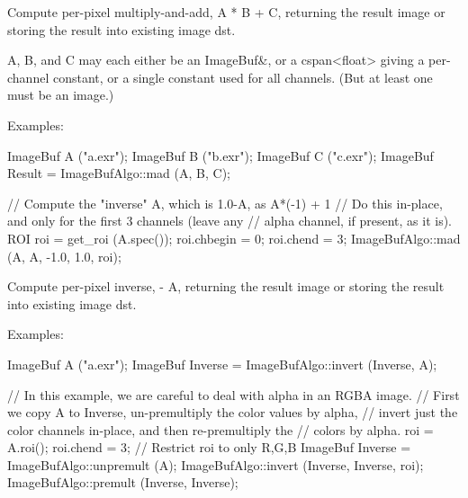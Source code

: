 Compute per-pixel multiply-and-add, {\cf A * B + C}, returning the result image
or storing the result into existing image {\cf dst}.

{\cf A}, {\cf B}, and {\cf C} may each either be an {\cf ImageBuf\&}, or a
{\cf cspan<float>} giving a per-channel constant, or a single constant used
for all channels. (But at least one must be an image.)

\smallskip
\noindent Examples:
\begin{code}
    ImageBuf A ("a.exr");
    ImageBuf B ("b.exr");
    ImageBuf C ("c.exr");
    ImageBuf Result = ImageBufAlgo::mad (A, B, C);

    // Compute the "inverse" A, which is 1.0-A, as A*(-1) + 1
    // Do this in-place, and only for the first 3 channels (leave any
    // alpha channel, if present, as it is).
    ROI roi = get_roi (A.spec());
    roi.chbegin = 0;  roi.chend = 3;
    ImageBufAlgo::mad (A, A, -1.0, 1.0, roi);
\end{code}
\apiend


 

Compute per-pixel inverse, { - A}, returning the result image
or storing the result into existing image {\cf dst}.

\smallskip
\noindent Examples:
\begin{code}
    ImageBuf A ("a.exr");
    ImageBuf Inverse = ImageBufAlgo::invert (Inverse, A);

    // In this example, we are careful to deal with alpha in an RGBA image.
    // First we copy A to Inverse, un-premultiply the color values by alpha,
    // invert just the color channels in-place, and then re-premultiply the
    // colors by alpha.
    roi = A.roi();
    roi.chend = 3;      // Restrict roi to only R,G,B
    ImageBuf Inverse = ImageBufAlgo::unpremult (A);
    ImageBufAlgo::invert (Inverse, Inverse, roi);
    ImageBufAlgo::premult (Inverse, Inverse);
\end{code}

\apiend


 

